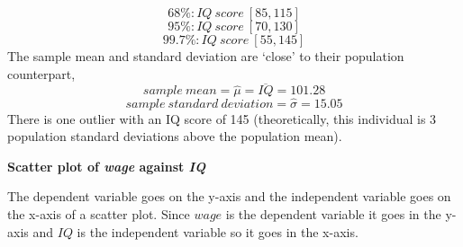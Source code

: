 \documentclass[12pt]{report}
\begin{document}
$$68\%: IQ\ score\ [85,115]$$
$$95\%: IQ\ score\ [70,130]$$
$$99.7\%: IQ\ score\ [55,145]$$
\noindent The sample mean and standard deviation are ‘close’ to their population counterpart,
$$sample\ mean = \hat{\mu} = \overline{IQ} = 101.28$$
$$sample\ standard\ deviation = \hat{\sigma} = 15.05$$
\noindent There is one outlier with an IQ score of 145 (theoretically, this individual is 3 population standard deviations above the population mean).
\begin{center}
	\noindent \textbf{Scatter plot of \textit{wage} against \textit{IQ}}
\end{center}
\noindent The dependent variable goes on the y-axis and the independent variable goes on the x-axis of a scatter plot. Since $wage$ is the dependent variable it goes in the y-axis and $IQ$ is the independent variable so it goes in the x-axis.
\end{document}
